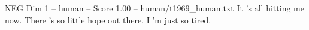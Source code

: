 \begin{textsample}{NEG Dim 1 – human – Score 1.00 – human/t1969\_human.txt}  \label{ex:f1_neg_006}
It ’s all hitting me now.
There ’s so little hope out there.
I ’m just so tired.

\end{textsample}
